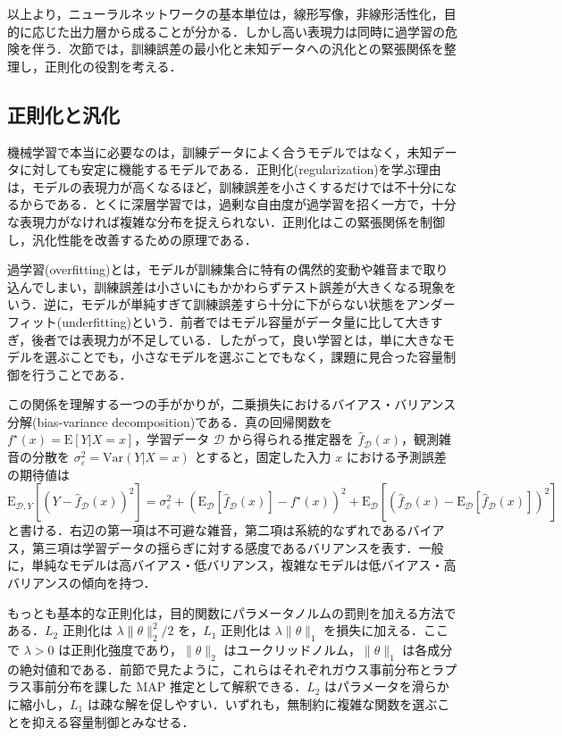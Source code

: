 以上より，ニューラルネットワークの基本単位は，線形写像，非線形活性化，目的に応じた出力層から成ることが分かる．しかし高い表現力は同時に過学習の危険を伴う．次節では，訓練誤差の最小化と未知データへの汎化との緊張関係を整理し，正則化の役割を考える．

\subsection{正則化と汎化}
機械学習で本当に必要なのは，訓練データによく合うモデルではなく，未知データに対しても安定に機能するモデルである．正則化(regularization)を学ぶ理由は，モデルの表現力が高くなるほど，訓練誤差を小さくするだけでは不十分になるからである．とくに深層学習では，過剰な自由度が過学習を招く一方で，十分な表現力がなければ複雑な分布を捉えられない．正則化はこの緊張関係を制御し，汎化性能を改善するための原理である．

過学習(overfitting)とは，モデルが訓練集合に特有の偶然的変動や雑音まで取り込んでしまい，訓練誤差は小さいにもかかわらずテスト誤差が大きくなる現象をいう．逆に，モデルが単純すぎて訓練誤差すら十分に下がらない状態をアンダーフィット(underfitting)という．前者ではモデル容量がデータ量に比して大きすぎ，後者では表現力が不足している．したがって，良い学習とは，単に大きなモデルを選ぶことでも，小さなモデルを選ぶことでもなく，課題に見合った容量制御を行うことである．

この関係を理解する一つの手がかりが，二乗損失におけるバイアス・バリアンス分解(bias-variance decomposition)である．真の回帰関数を $f^\star(x)=\mathrm{E}[Y|X=x]$，学習データ $\mathcal D$ から得られる推定器を $\hat f_{\mathcal D}(x)$，観測雑音の分散を $\sigma_\varepsilon^2=\mathrm{Var}(Y|X=x)$ とすると，固定した入力 $x$ における予測誤差の期待値は
\[
\mathrm{E}_{\mathcal D,Y}\left[(Y-\hat f_{\mathcal D}(x))^2\right]
= \sigma_\varepsilon^2
+ \left(\mathrm{E}_{\mathcal D}[\hat f_{\mathcal D}(x)]-f^\star(x)\right)^2
+ \mathrm{E}_{\mathcal D}\left[
\left(
\hat f_{\mathcal D}(x)-\mathrm{E}_{\mathcal D}[\hat f_{\mathcal D}(x)]
\right)^2
\right]
\]
と書ける．右辺の第一項は不可避な雑音，第二項は系統的なずれであるバイアス，第三項は学習データの揺らぎに対する感度であるバリアンスを表す．一般に，単純なモデルは高バイアス・低バリアンス，複雑なモデルは低バイアス・高バリアンスの傾向を持つ．

もっとも基本的な正則化は，目的関数にパラメータノルムの罰則を加える方法である．$L_2$ 正則化は $\lambda\|\theta\|_2^2/2$ を，$L_1$ 正則化は $\lambda\|\theta\|_1$ を損失に加える．ここで $\lambda>0$ は正則化強度であり，$\|\theta\|_2$ はユークリッドノルム，$\|\theta\|_1$ は各成分の絶対値和である．前節で見たように，これらはそれぞれガウス事前分布とラプラス事前分布を課した MAP 推定として解釈できる．$L_2$ はパラメータを滑らかに縮小し，$L_1$ は疎な解を促しやすい．いずれも，無制約に複雑な関数を選ぶことを抑える容量制御とみなせる．

